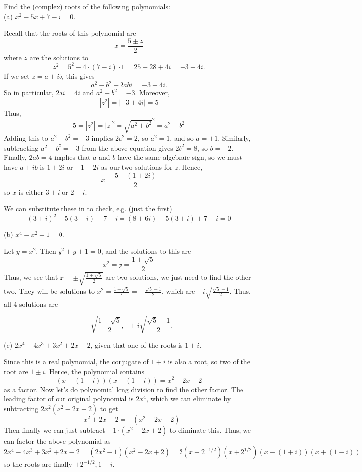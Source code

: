 \documentclass[11pt,dvipsnames]{book}
\numberwithin{equation}{section} %
\numberwithin{figure}{section} %
\numberwithin{table}{section} %
\begin{document}
\begin{exercise} Find the (complex) roots of the following polynomials:\\

(a) $x^2-5x+7-i=0$. 

\begin{solution}
Recall that the roots of this polynomial are 
\[x= \frac{5\pm z}{2}\]
where $z$ are the solutions to 
\[z^2 = 5^2-4\cdot (7-i)\cdot 1  = 25-28+4i = -3+4i.\]
If we set $z=a+ib$, this gives
\[a^2-b^2+2abi = -3+4i.\]
So in particular, $2ai = 4i$ and $a^2-b^2 = -3$. Moreover, 
\[|z^2|= |-3 + 4i| = 5\]
Thus, 
\[
5=|z^2|=|z|^2 = \sqrt{a^2+b^2}^2 = a^2+b^2
\]
Adding this to  $a^2-b^2=-3$ implies $2a^2 = 2$, so $a^2=1$, and so $a = \pm 1$. 
Similarly, subtracting $a^2-b^2=-3$ from the above equation gives $2b^2 = 8$, so $b=\pm 2$. 
Finally, $2ab = 4$ implies that $a$ and $b$ have the same algebraic sign, so we must have $a+ib$ is $1+2i$ or $-1-2i$ as our two solutions for $z$. Hence,
\[
x=\frac{5 \pm (1+2i)}{2} \]
so $x$ is either $3+i$ or $2-i$. 

We can substitute these in to check, e.g. (just the first)
\[ (3+i)^2-5(3+i)+7-i = (8+6i)-5(3+i)+7-i =0 \]
\end{solution}

(b)  $ x^4 -x^2 - 1 = 0$.

\begin{solution}
Let $y=x^2$. Then $y^2+y+1=0$, and the solutions to this are
\[
x^2=y=\frac{1\pm \sqrt{5}}{2} 
\]
Thus, we see that $x=\pm \sqrt{\frac{1+\sqrt{5}}{2}}$ are two solutions, we just need to find the other two. They will be solutions to $x^2 = \frac{1-\sqrt{5}}{2} = - \frac{\sqrt{5}-1}{2}$, which are $\pm i \sqrt{\frac{\sqrt{5}-1}{2}}$. Thus, all 4 solutions are 

\[
\pm \sqrt{\frac{1+\sqrt{5}}{2}}, \;\; \pm i \sqrt{\frac{\sqrt{5}-1}{2}}.
\]
\end{solution}


(c) $2x^4-4x^3+3x^2+2x-2$, given that one of the roots is $1+i$.

\begin{solution}
Since this is a real polynomial, the conjugate of $1+i$ is also a root, so two of the root are $1\pm i$. Hence, the polynomial contains 
\[
(x-(1+i))(x-(1-i))=
x^2-2x+2
\]
as a factor. Now let's do polynomial long division to find the other factor. The leading factor of our original polynomial is $2x^{4}$, which we can eliminate by subtracting $2x^2(x^2-2x+2)$ to get
\[
-x^2+2x-2=-(x^2-2x+2)
\]
Then finally we can just subtract $-1\cdot (x^2-2x+2)$ to eliminate this.
Thus, we can factor the above polynomial as
\[
2x^4-4x^3+3x^2+2x-2=(2x^2-1)(x^2-2x+2)=2(x-2^{-1/2})(x+2^{1/2})(x-(1+i))(x+(1-i))
\]
so the roots are finally $\pm 2^{-1/2}, 1\pm i$.
\end{solution}

\end{exercise}
\end{document}
